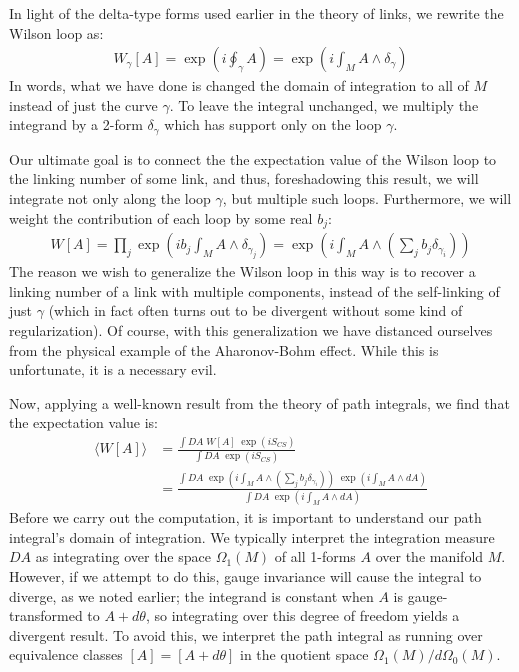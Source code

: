 \documentclass[12pt]{article}
\begin{document}
In light of the delta-type forms used earlier in the theory of links, we rewrite the Wilson loop as:
\begin{align*}
W_\gamma[A]=\exp\left(i\oint_{\gamma} A\right) = \exp\left(i\int_{M} A\wedge \delta_{\gamma}\right)
\end{align*}
In words, what we have done is changed the domain of integration to all of $M$ instead of just the curve $\gamma$. To leave the integral unchanged, we multiply the integrand by a 2-form $\delta_{\gamma}$ which has support only on the loop $\gamma$.

Our ultimate goal is to connect the the expectation value of the Wilson loop to the linking number of some link, and thus, foreshadowing this result, we will integrate not only along the loop $\gamma$, but multiple such loops. Furthermore, we will
weight the contribution of each loop by some real $b_j$:
\begin{align*}
W[A]=\prod_j \exp\left(i b_j \int_{M} A\wedge \delta_{\gamma_j}\right) =\exp\left(i\int_{M} A\wedge (\sum_j b_j \delta_{\gamma_i})\right)
\end{align*}
The reason we wish to generalize the Wilson loop in this way is to recover a linking number of a link with multiple components, instead of the self-linking of just $\gamma$ (which in fact often turns out to be divergent without some kind of regularization)\cite{infinite}. Of course, with this generalization we have distanced ourselves from the physical example of the Aharonov-Bohm effect. While this is unfortunate, it is a necessary evil.

Now, applying a well-known result from the theory of path integrals, we find that the expectation value is:
\begin{align*}
\langle W[A] \rangle&=\frac{\int DA \; W[A]\; \exp\left(iS_{CS}\right)}{\int DA \;\exp\left(iS_{CS}\right)}\\
&=\frac{\int DA \; \exp\left(i\int_{M} A\wedge (\sum_j b_j \delta_{\gamma_i})\right)\; \exp\left(i\int_M A\wedge dA\right)}{\int DA \;\exp\left(i\int_M A\wedge dA\right) }
\end{align*}
Before we carry out the computation, it is important to understand our path integral's domain of integration. We typically interpret the integration measure $DA$ as integrating over the space $\Omega_1(M)$ of all 1-forms $A$ over the manifold $M$. However, if we attempt to do this, gauge invariance will cause the integral to diverge, as we noted earlier; the integrand is constant when $A$ is gauge-transformed to $A+d\theta$, so integrating over this degree of freedom yields a divergent result. To avoid this, we interpret the path integral as running over equivalence classes $[A] = [A+d\theta]$ in the quotient space $\Omega_1(M)/d\Omega_0(M)$.
\end{document}
